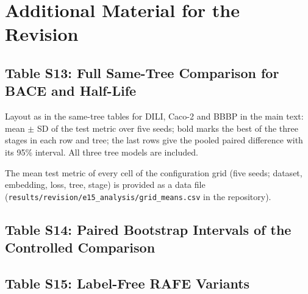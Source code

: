\documentclass[9pt,a4paper]{article}
\begin{document}
\section*{Additional Material for the Revision}

\subsection*{Table S13: Full Same-Tree Comparison for BACE and Half-Life}
Layout as in the same-tree tables for DILI, Caco-2 and BBBP in the main text: mean $\pm$ SD of the test metric over five seeds; bold marks the best of the three stages in each row and tree; the last rows give the pooled paired difference with its 95\% interval. All three tree models are included.

\begin{table}[htbp]
\centering
\caption{BACE (test MCC).}
\scriptsize
{}
\end{table}

\begin{table}[htbp]
\centering
\caption{Half-Life (test Spearman).}
\scriptsize
{}
\end{table}

The mean test metric of every cell of the configuration grid (five seeds; dataset, embedding, loss, tree, stage) is provided as a data file (\texttt{results/revision/e15\_analysis/grid\_means.csv} in the repository).

\subsection*{Table S14: Paired Bootstrap Intervals of the Controlled Comparison}
{\scriptsize}

\subsection*{Table S15: Label-Free RAFE Variants}
{\scriptsize}
\end{document}
